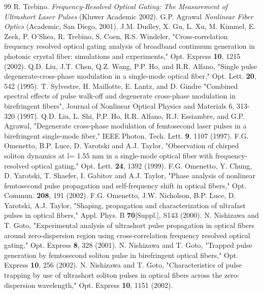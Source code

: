 \begin{thebibliography}{99}
 R. Trebino. {\em Frequency-Resolved Optical Gating: The Measurement of Ultrashort Laser Pulses} (Kluwer Academic 2002).
 G.P. Agrawal {\em Nonlinear Fiber Optics} (Academic,
San Diego, 2001).
 J.M. Dudley, X. Gu, L. Xu, M. Kimmel, E. Zeek, P. O'Shea, R. Trebino, S. Coen, R.S. Windeler, "Cross-correlation frequency resolved optical gating analysis of broadband continuum generation in photonic crystal fiber: simulations and experiments," Opt. Express \textbf{10}, 1215 (2002).
 Q.D. Liu, J.T. Chen, Q.Z. Wang, P.P. Ho, and R.R. Alfano, "Single pulse degenerate-cross-phase modulation in a single-mode optical fiber," Opt. Lett. \textbf{20}, 542 (1995).
 T. Sylvestre, H. Maillotte, E. Lantz, and D. Gindre "Combined spectral effects of pulse walk-off and degenerate cross-phase modulation in birefringent fibers", Journal of Nonlinear Optical Physics and Materials 6, 313-320 (1997).
 Q.D. Liu, L. Shi, P.P. Ho, R.R. Alfano, R.J. Essiambre, and G.P. Agrawal, "Degenerate cross-phase modulation of femtosecond laser pulses in a birefringent single-mode fiber," IEEE Photon. Tech. Lett. \textbf{9}, 1107 (1997).
 F.G. Omenetto, B.P. Luce, D. Yarotski and A.J. Taylor, "Observation of chirped soliton dynamics at l= 1.55 mm in a single-mode optical fiber with frequency-resolved optical gating," Opt. Lett. \textbf{24}, 1392 (1999).
 F.G. Omenetto, Y. Chung, D. Yarotski, T. Shaefer, I. Gabitov and A.J. Taylor, "Phase analysis of nonlinear femtosecond pulse propagation and self-frequency shift in optical fibers," Opt. Commun. \textbf{208}, 191 (2002).
 F.G. Omenetto, J.W. Nicholson, B.P. Luce, D. Yarotski, A.J. Taylor, "Shaping, propagation and characterization of ultrafast pulses in optical fibers," Appl. Phys. B \textbf{70}[Suppl.], S143 (2000).
 N. Nishizawa and T. Goto, "Experimental analysis of ultrashort pulse propagation in optical fibers around zero-dispersion region using cross-correlation frequency resolved optical gating," Opt. Express \textbf{8}, 328 (2001).
 N. Nishizawa and T. Goto, "Trapped pulse generation by femtosecond soliton pulse in birefringent optical fibers," Opt. Express \textbf{10}, 256 (2002).
 N. Nishizawa and T. Goto, "Characteristics of pulse trapping by use of ultrashort soliton pulses in optical fibers across the zero-dispersion wavelength," Opt. Express \textbf{10}, 1151 (2002).

\end{thebibliography}
